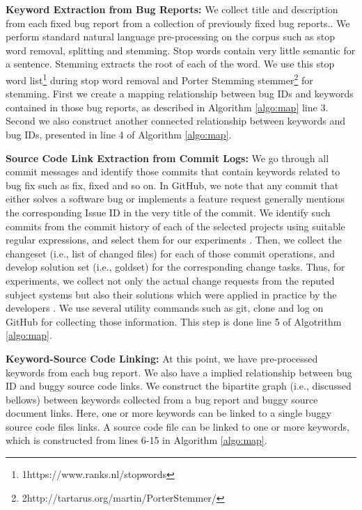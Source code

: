 \documentclass[conference]{IEEEtran}
\let\footnotesize\scriptsize
\begin{document}
\textbf{Keyword Extraction from Bug Reports:} We collect title and description from each fixed bug report from a collection of previously fixed bug reports.. We perform standard natural language pre-processing on the corpus such as stop word removal, splitting and stemming. Stop words contain very little semantic for a sentence. Stemming extracts the root of each of the word. We use this stop word list\footnote{{1}https://www.ranks.nl/stopwords} during stop word removal and Porter Stemming stemmer\footnote{{2}http://tartarus.org/martin/PorterStemmer/} for stemming. First we create a mapping relationship between bug IDs and keywords contained in those bug reports, as described in Algorithm \ref{algo:map} line 3. Second we also construct another connected relationship between keywords and bug IDs, presented in
line 4 of Algorithm \ref{algo:map}.



\textbf{Source Code Link Extraction from Commit Logs:}
We go through all commit messages and identify those commits that contain keywords related to bug fix such as fix, fixed and so on.
In  GitHub, we  note  that any commit that either solves a software bug or implements a feature request generally mentions the corresponding Issue ID
in the very title of the commit.
We identify such commits from the commit history of each of the selected projects using suitable regular expressions, and select them for our experiments
\cite{Bachmann}. Then, we collect the changeset (i.e., list of changed files)
for each of those commit operations, and develop solution set (i.e.,
goldset) for the corresponding change tasks. Thus, for experiments, we collect not only the actual change requests from the reputed subject systems but also their solutions which were applied in practice by the developers \cite{SHaiduc}. We use several
utility commands such as git, clone and log on GitHub for collecting those information. This step is done line 5 of Algotrithm \ref{algo:map}. 

\textbf{Keyword-Source Code Linking:}
At this point, we have pre-processed keywords from each bug report. We also have a implied relationship between bug ID and buggy source code links. We construct the bipartite graph (i.e., discussed bellows) between keywords collected from a bug report and buggy source document links. Here, one or more keywords can be linked to a single buggy source code files links. A source code file can be linked to one or more keywords, which is constructed from lines 6-15 in Algorithm \ref{algo:map}.
\end{document}

